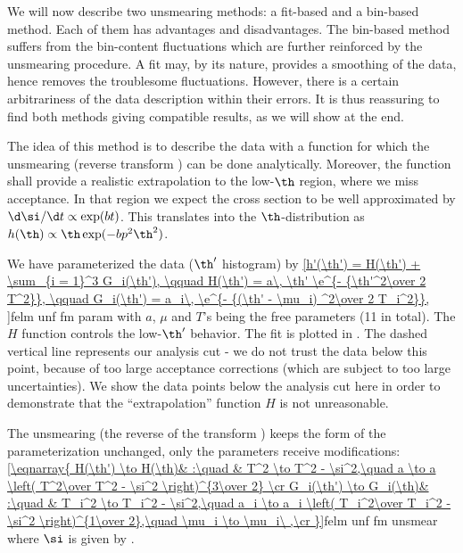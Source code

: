 We will now describe two unsmearing methods: a fit-based and a bin-based method. Each of them has advantages and disadvantages. The bin-based method suffers from the bin-content fluctuations which are further reinforced by the unsmearing procedure. A fit may, by its nature, provides a smoothing of the data, hence removes the troublesome fluctuations. However, there is a certain arbitrariness of the data description within their errors. It is thus reassuring to find both methods giving compatible results, as we will show at the end.



The idea of this method is to describe the data with a function for which the unsmearing (reverse transform ) can be done analytically. Moreover, the function shall provide a realistic extrapolation to the low-$\th$ region, where we miss acceptance. In that region we expect the cross section to be well approximated by $\d\si/\d t \propto \exp(bt)$. This translates into the $\th$-distribution as $h(\th) \propto \th \exp(-bp^2 \th^2)$.

We have parameterized the data ($\th'$ histogram) by
\eqref{h'(\th') = H(\th') + \sum_{i = 1}^3 G_i(\th'),
	\qquad H(\th') = a\, \th' \e^{- {\th'^2\over 2 T^2}},
	\qquad G_i(\th') = a_i\, \e^{- {(\th' - \mu_i) ^2\over 2 T_i^2}},
}{felm unf fm param}
with $a$, $\mu$ and $T$'s being the free parameters (11 in total). The $H$ function controls the low-$\th'$ behavior. The fit is plotted in . The dashed vertical line represents our analysis cut - we do not trust the data below this point, because of too large acceptance corrections (which are subject to too large uncertainties). We show the data points below the analysis cut here in order to demonstrate that the ``extrapolation'' function $H$ is not unreasonable.

\bmfig
{}
\emfig

The unsmearing (the reverse of the transform ) keeps the form of the parameterization  unchanged, only the parameters receive modifications:
\eqref{\eqnarray{
H(\th') \to H(\th)& :\quad & T^2 \to T^2 - \si^2,\quad a \to a \left( T^2\over T^2 - \si^2 \right)^{3\over 2} \cr
G_i(\th') \to G_i(\th)& :\quad & T_i^2 \to T_i^2 - \si^2,\quad a_i \to a_i \left( T_i^2\over T_i^2 - \si^2 \right)^{1\over 2},\quad \mu_i \to \mu_i\ ,\cr
}}{felm unf fm unsmear}
where $\si$ is given by .

